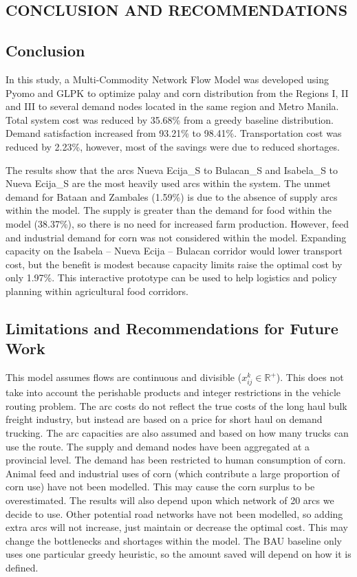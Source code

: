 \documentclass{icsthesis}
\begin{document}
\begin{mainmatter}
\section{CONCLUSION AND RECOMMENDATIONS}

\subsection{Conclusion}
In this study, a Multi-Commodity Network Flow Model was developed using Pyomo and GLPK to optimize palay and corn distribution from the Regions I, II and III to several demand nodes located in the same region and Metro Manila. Total system cost was reduced by 35.68\% from a greedy baseline distribution. Demand satisfaction increased from 93.21\% to 98.41\%. Transportation cost was reduced by 2.23\%, however, most of the savings were due to reduced shortages.

The results show that the arcs Nueva Ecija\_S to Bulacan\_S and Isabela\_S to Nueva Ecija\_S are the most heavily used arcs within the system. The unmet demand for Bataan and Zambales (1.59\%) is due to the absence of supply arcs within the model. The supply is greater than the demand for food within the model (38.37\%), so there is no need for increased farm production. However, feed and industrial demand for corn was not considered within the model. Expanding capacity on the Isabela -- Nueva Ecija -- Bulacan corridor would lower transport cost, but the benefit is modest because capacity limits raise the optimal cost by only 1.97\%. This interactive prototype can be used to help logistics and policy planning within agricultural food corridors.


\subsection{Limitations and Recommendations for Future Work}
This model assumes flows are continuous and divisible ($x_{ij}^k \in \mathbb{R}^+$). This does not take into account the perishable products and integer restrictions in the vehicle routing problem. The arc costs do not reflect the true costs of the long haul bulk freight industry, but instead are based on a price for short haul on demand trucking. The arc capacities are also assumed and based on how many trucks can use the route. The supply and demand nodes have been aggregated at a provincial level. The demand has been restricted to human consumption of corn. Animal feed and industrial uses of corn (which contribute a large proportion of corn use) have not been modelled. This may cause the corn surplus to be overestimated. The results will also depend upon which network of 20 arcs we decide to use. Other potential road networks have not been modelled, so adding extra arcs will not increase, just maintain or decrease the optimal cost. This may change the bottlenecks and shortages within the model. The BAU baseline only uses one particular greedy heuristic, so the amount saved will depend on how it is defined.


\end{mainmatter}
\end{document}
